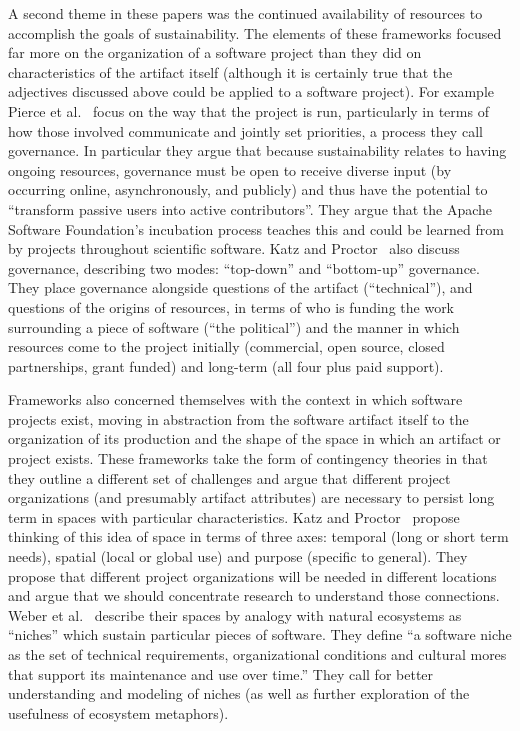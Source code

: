 \documentclass[11pt, oneside]{amsart}
\begin{document}
A second theme in these papers was the continued availability of
resources to accomplish the goals of sustainability. The elements of
these frameworks focused far more on the organization of a software
project than they did on characteristics of the artifact itself
(although it is certainly true that the adjectives discussed above
could be applied to a software project). For example Pierce et
al.~\cite{Pierce_WSSSPE} focus on the way that the project is run,
particularly in terms of how those involved communicate and jointly
set priorities, a process they call governance. In particular they
argue that because sustainability relates to having ongoing resources,
governance must be open to receive diverse input (by occurring online,
asynchronously, and publicly) and thus have the potential to
``transform passive users into active contributors''. They argue that
the Apache Software Foundation's incubation process teaches this and
could be learned from by projects throughout scientific software.
Katz and Proctor~\cite{Katz_WSSSPE} also discuss governance,
describing two modes: ``top-down'' and ``bottom-up'' governance.  They
place governance alongside questions of the artifact (``technical''),
and questions of the origins of resources, in terms of who is funding
the work surrounding a piece of software (``the political'') and the
manner in which resources come to the project initially (commercial,
open source, closed partnerships, grant funded) and long-term (all
four plus paid support).

Frameworks also concerned themselves with the context in which
software projects exist, moving in abstraction from the software
artifact itself to the organization of its production and the shape of
the space in which an artifact or project exists.  These frameworks
take the form of contingency theories in that they outline a different
set of challenges and argue that different project organizations (and
presumably artifact attributes) are necessary to persist long term in
spaces with particular characteristics.  Katz and
Proctor~\cite{Katz_WSSSPE} propose thinking of this idea of space in
terms of three axes: temporal (long or short term needs), spatial
(local or global use) and purpose (specific to general).  They propose
that different project organizations will be needed in different
locations and argue that we should concentrate research to understand
those connections. Weber et al.~\cite{Weber_WSSSPE} describe their
spaces by analogy with natural ecosystems as ``niches'' which sustain
particular pieces of software. They define ``a software niche as the
set of technical requirements, organizational conditions and cultural
mores that support its maintenance and use over time.'' They call for
better understanding and modeling of niches (as well as further
exploration of the usefulness of ecosystem metaphors).
\end{document}
